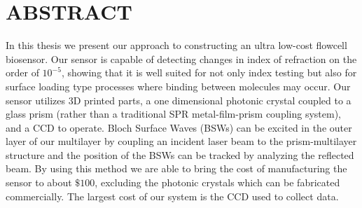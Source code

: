 \section*{ABSTRACT}
\hspace{0.25in}
In this thesis we present our approach to constructing an ultra low-cost flowcell biosensor. Our sensor is capable of detecting changes in index of refraction on the order of $10^{-5}$, showing that it is well suited for not only index testing but also for surface loading type processes where binding between molecules may occur. Our sensor utilizes 3D printed parts, a one dimensional photonic crystal coupled to a glass prism (rather than a traditional SPR metal-film-prism coupling system), and a CCD to operate. Bloch Surface Waves (BSWs) can be excited in the outer layer of our multilayer by coupling an incident laser beam to the prism-multilayer structure and the position of the BSWs can be tracked by analyzing the reflected beam. By using this method we are able to bring the cost of manufacturing the sensor to about $\$100$, excluding the photonic crystals which can be fabricated commercially. The largest cost of our system is the CCD used to collect data. \\